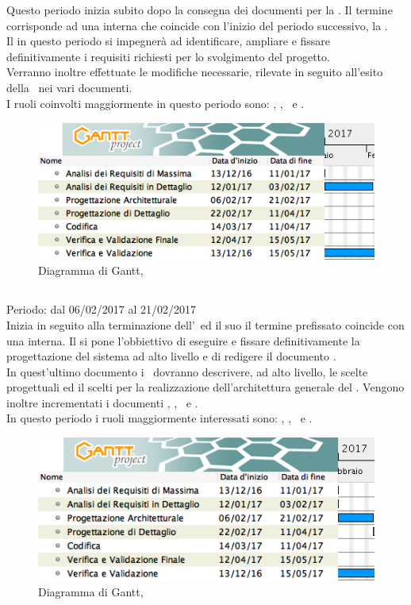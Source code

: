 Questo periodo inizia subito dopo la consegna dei documenti per la \RR. Il termine corrisponde ad una  interna che coincide con l'inizio del periodo successivo, la \PA.\\
Il  in questo periodo si impegnerà ad identificare, ampliare e fissare definitivamente i requisiti richiesti per lo svolgimento del progetto.\\
Verranno inoltre effettuate le modifiche necessarie, rilevate in seguito all'esito della \RR\, nei vari documenti.\\
I ruoli coinvolti maggiormente in questo periodo sono: \An, \Am, \Pm\ e \Ver.

\begin{figure}[H]
	\centering 
	\includegraphics[scale=0.5]{Immagini/Gantt/ARD.png}
	\caption{Diagramma di Gantt, \ARD}
\end{figure}

\subsection{\PA}
Periodo: dal 06/02/2017 al 21/02/2017 \\

Inizia in seguito alla terminazione dell'\ARD\ ed il suo il termine prefissato coincide con una  interna.
Il  si pone l'obbiettivo di eseguire e fissare definitivamente la progettazione del sistema ad alto livello e di redigere il documento \ST.\\
In quest'ultimo documento i \ProgP\ dovranno descrivere, ad alto livello, le scelte progettuali ed il  scelti per la realizzazione dell'architettura generale del . Vengono inoltre incrementati i documenti \NdP, \PdP, \PdQ\ e \Gl.\\
In questo periodo i ruoli maggiormente interessati sono: \Prog, \Pm, \Ver\ e \Am.

 \begin{figure}[H]
	\centering 
	\includegraphics[scale=0.5]{Immagini/Gantt/PA.png}
	\caption{Diagramma di Gantt, \PA}
\end{figure}

